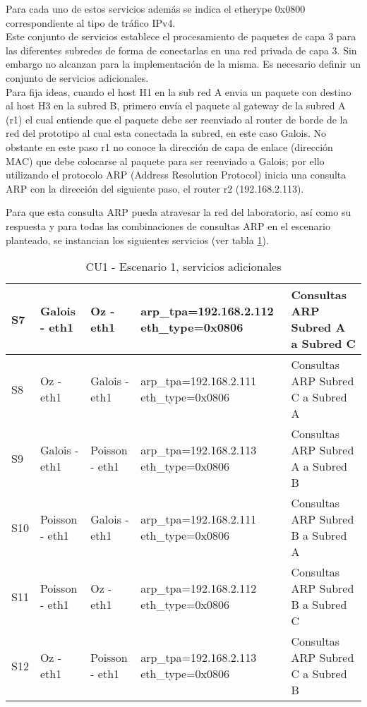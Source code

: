 Para cada uno de estos servicios adem\'as se indica el etherype 0x0800 correspondiente al tipo de tr\'afico IPv4.\\

Este conjunto de servicios establece el procesamiento de paquetes de capa 3 para las diferentes subredes de forma de conectarlas en una red privada de capa 3. Sin embargo no alcanzan para la implementaci\'on de la misma. Es necesario definir un conjunto de servicios adicionales.\\

Para fija ideas, cuando el host H1 en la sub red A envia un paquete con destino al host H3 en la subred B, primero envía el paquete al gateway de la subred A (r1) el cual entiende que el paquete debe ser reenviado al router de borde de la red del prototipo al cual esta conectada la subred, en este caso Galois. No obstante en este paso r1 no conoce la dirección de capa de enlace (direcci\'on MAC) que debe colocarse al paquete para ser reenviado a Galois; por ello utilizando el protocolo ARP (Address Resolution Protocol) inicia una consulta ARP con la direcci\'on del siguiente paso, el router r2 (192.168.2.113).

Para que esta consulta ARP pueda atravesar la red del laboratorio, así como su respuesta y para todas las combinaciones de consultas ARP en el escenario planteado, se instancian los siguientes servicios (ver tabla \ref{table:TablaFlujos2}). 

\begin{table}[h]
\begin{tabular}{| l | l | l | p{4cm} | p{4cm} |}
\hline
 
S7 & Galois - eth1 & Oz - eth1 & arp\_tpa=192.168.2.112 eth\_type=0x0806 & Consultas ARP Subred A a Subred C \\ \hline

S8 & Oz - eth1 & Galois - eth1 & arp\_tpa=192.168.2.111 eth\_type=0x0806 & Consultas ARP Subred C a Subred A \\ \hline

S9 & Galois - eth1 & Poisson - eth1 & arp\_tpa=192.168.2.113 eth\_type=0x0806 & Consultas ARP Subred A a Subred B \\ \hline

S10 & Poisson - eth1 & Galois - eth1 & arp\_tpa=192.168.2.111 eth\_type=0x0806 & Consultas ARP Subred B a Subred A \\ \hline

S11 & Poisson - eth1 & Oz - eth1 & arp\_tpa=192.168.2.112 eth\_type=0x0806 & Consultas ARP Subred B a Subred C \\ \hline

S12 & Oz - eth1 & Poisson - eth1 & arp\_tpa=192.168.2.113 eth\_type=0x0806 & Consultas ARP Subred C a Subred B \\ \hline

\end{tabular}
\vspace{0.3cm}
\caption[CU1 - Escenario 1, servicios adicionales]{CU1 - Escenario 1, servicios adicionales}
\label{table:TablaFlujos2}
\end{table}

